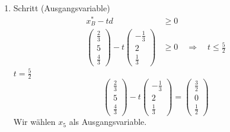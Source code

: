 \documentclass[a4paper]{scrartcl}
\begin{document}
\begin{enumerate}[label=\bfseries\arabic*.]
\begin{enumerate}
\begin{enumerate}[1.]
\begin{enumerate}[1.]
                            \item Schritt (Ausgangsvariable)
                                \begin{equation}
                                    \begin{split}
                                        x_B^* - td &\geq 0 \\
                                        \begin{pmatrix}
                                            \frac{2}{3} \\ 5 \\ \frac{4}{3}
                                        \end{pmatrix}
                                        - t
                                        \begin{pmatrix}
                                            -\frac{1}{3} \\ 2 \\ \frac{1}{3}
                                        \end{pmatrix}
                                        &\geq 0
                                        \quad\Rightarrow\quad
                                        t \leq \frac{5}{2}
                                    \end{split}
                                \end{equation}
                                $t = \frac{5}{2}$
                                \begin{equation}
                                    \begin{pmatrix}
                                        \frac{2}{3} \\ 5 \\ \frac{4}{3}
                                    \end{pmatrix}
                                    - t
                                    \begin{pmatrix}
                                        -\frac{1}{3} \\ 2 \\ \frac{1}{3}
                                    \end{pmatrix}
                                    =
                                    \begin{pmatrix}
                                        \frac{3}{2} \\ 0 \\ \frac{1}{2}
                                    \end{pmatrix}
                                \end{equation}
                                Wir wählen $x_5$ als Ausgangsvariable.


\end{enumerate}
\end{enumerate}
\end{enumerate}
\end{enumerate}
\end{document}
